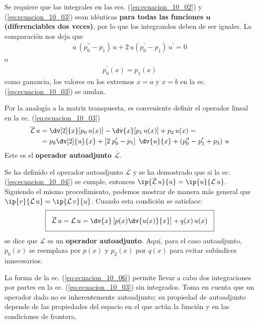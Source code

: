 Se requiere que las integrales en las ecs. (\ref{eq:ecuacion_10_02}) y (\ref{eq:ecuacion_10_03}) sean idénticas \textbf{para todas las funciones $\bm{u}$ (diferenciables dos veces)}, por lo que los integrandos deben de ser iguales. La comparación nos deja que
\begin{align*}
u \, (p_{0}^{\prime \prime} - p_{1}) \, u + 2 \, u (p_{0}^{\prime} - p_{1}) \, u^{\prime} = 0
\end{align*}
o
\begin{align}
p_{0}^{\prime} (x) = p_{1} (x)
\label{eq:ecuacion_10_04}
\end{align}
como ganancia, los valores en los extremos $x=a$ y $x=b$ en la ec. (\ref{eq:ecuacion_10_03}) se anulan.
\par
Por la analogía a la matriz transpuesta, es conveniente definir el operador lineal en la ec. (\ref{eq:ecuacion_10_03})
\begin{align}
\begin{aligned}
\overline{\mathcal{L}} \, u &= \dv[2]{x} [ p_{0} \, u(x)] - \dv{x} [p_{1} \, u(x)] + p_{2} \, u(x) = \\
&= p_{0} \dv[2]{u}{x} + \left[ 2 \; p_{0}^{\prime} - p_{1} \right] \; \dv{u}{x} + \left( p_{0}^{\prime \prime} - p_{1}^{\prime} + p_{2} \right) \, u
\label{eq:ecuacion_10_05}
\end{aligned}
\end{align}
Este es el \textbf{operador autoadjunto $\overline{\mathcal{L}}$}.
\par 
Se ha definido el operador autoadjunto $\overline{\mathcal{L}}$ y se ha demostrado que si la ec. (\ref{eq:ecuacion_10_04}) se cumple, entonces $\ip{\overline{\mathcal{L}} \, u}{u} = \ip{u}{\mathcal{L} \, u}$. Siguiendo el mismo procedimiento, podemos mostrar de manera más general que $\ip{v}{\mathcal{L} \, u} = \ip{\mathcal{L} \, v}{u}$. Cuando esta condición se satisface:
\begin{equation}
\setlength{\fboxsep}{3\fboxsep}\boxed{\overline{\mathcal{L}} \, u = \mathcal{L} \, u = \dv{x} \left[ p(x) \dv{u(x)}{x} \right] + q(x) \, u(x)}
\label{eq:ecuacion_10_06}
\end{equation}
se dice que $\mathcal{L}$ es un \textbf{operador autoadjunto}. Aquí, para el caso autoadjunto, $p_{0}(x)$ se reemplaza por $p(x)$ y $p_{2}(x)$ por $q(x)$ para evitar subíndices innecesarios.
\par
La forma de la ec. (\ref{eq:ecuacion_10_06}) permite llevar a cabo dos integraciones por partes en la ec. (\ref{eq:ecuacion_10_03}) sin integrados. Toma en cuenta que un operador dado no es inherentemente autoadjunto; su propiedad de autoadjunto depende de las propiedades del espacio en el que actúa la función y en las condiciones de frontera.

